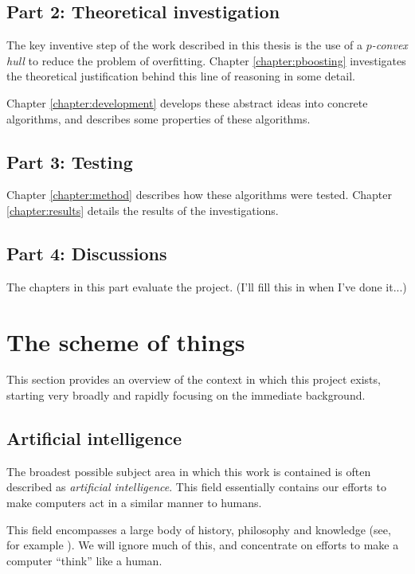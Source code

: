 \subsection*{Part 2: Theoretical investigation}

The key inventive step of the work described in this thesis is the use of a
\emph{$p$-convex hull} to reduce the problem of overfitting.  Chapter
\ref{chapter:pboosting} investigates the theoretical justification
behind this line of reasoning in some detail.

Chapter \ref{chapter:development} develops these abstract ideas into
concrete algorithms, and describes some properties of these
algorithms.

\subsection*{Part 3: Testing}

Chapter \ref{chapter:method} describes how these algorithms were
tested.  Chapter \ref{chapter:results} details the results of the
investigations.

\subsection*{Part 4: Discussions}

The chapters in this part evaluate the project.  (I'll fill this in
when I've done it...)


\section{The scheme of things}

This section provides an overview of the context in which this project
exists, starting very broadly and rapidly focusing on the immediate
background.


\subsection{Artificial intelligence}

The broadest possible subject area in which this work is contained is
often described as \emph{artificial intelligence}.  This field
essentially contains our efforts to make computers act in a similar
manner to humans.

This field encompasses a large body of history, philosophy and
knowledge (see, for example \cite{Penrose89}).  We will ignore much
of this, and concentrate on efforts to make a computer ``think'' like
a human.

